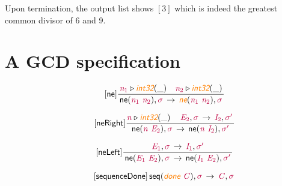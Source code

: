 \documentclass[11pt]{book}
\newcommand{\artVariable}[1]{\mbox{\color{purple}\em #1\/}}
\newcommand{\artConstructor}[1]{\mbox{\sf #1}}
\newcommand{\artSpecial}[1]{\mbox{\color{orange}\sf\em #1}}
\begin{document}
Upon termination, the output list shows $[3]$ which is indeed the greatest common divisor of 6 and 9.

\section{A GCD specification}
\begin{equation}
\tag*{[\artConstructor{\sf ne}]}
\begin{split}\frac{ \artVariable{n$_{1}$}\triangleright \artSpecial{int32}(\_) \quad  \artVariable{n$_{2}$}\triangleright \artSpecial{int32}(\_) }{\, \artConstructor{\sf ne}(\artVariable{n$_{1}$}\ \artVariable{n$_{2}$}), \artVariable{$\sigma$}\, \rightarrow \, \artSpecial{ne}(\artVariable{n$_{1}$}\ \artVariable{n$_{2}$}), \artVariable{$\sigma$}\, }
\end{split}
\end{equation}

\begin{equation}
\tag*{[\artConstructor{\sf neRight}]}
\begin{split}\frac{ \artVariable{n}\triangleright \artSpecial{int32}(\_) \quad \, \artVariable{E$_{2}$}, \artVariable{$\sigma$}\, \rightarrow \, \artVariable{I$_{2}$}, \artVariable{$\sigma$\/$^\prime$}\, }{\, \artConstructor{\sf ne}(\artVariable{n}\ \artVariable{E$_{2}$}), \artVariable{$\sigma$}\, \rightarrow \, \artConstructor{\sf ne}(\artVariable{n}\ \artVariable{I$_{2}$}), \artVariable{$\sigma$\/$^\prime$}\, }
\end{split}
\end{equation}

\begin{equation}
\tag*{[\artConstructor{\sf neLeft}]}
\begin{split}\frac{\, \artVariable{E$_{1}$}, \artVariable{$\sigma$}\, \rightarrow \, \artVariable{I$_{1}$}, \artVariable{$\sigma$\/$^\prime$}\, }{\, \artConstructor{\sf ne}(\artVariable{E$_{1}$}\ \artVariable{E$_{2}$}), \artVariable{$\sigma$}\, \rightarrow \, \artConstructor{\sf ne}(\artVariable{I$_{1}$}\ \artVariable{E$_{2}$}), \artVariable{$\sigma$\/$^\prime$}\, }
\end{split}
\end{equation}

\begin{equation}
\tag*{[\artConstructor{\sf sequenceDone}]}
\begin{split}\, \artConstructor{\sf seq}(\artSpecial{done}\ \artVariable{C}), \artVariable{$\sigma$}\, \rightarrow \, \artVariable{C}, \artVariable{$\sigma$}\, 
\end{split}
\end{equation}
\end{document}
